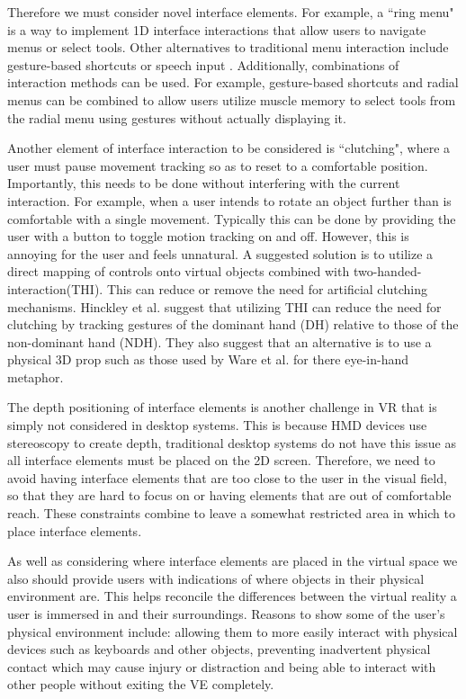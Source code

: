 \documentclass{sig-alternate-05-2015}
\begin{document}
Therefore we must consider novel interface elements. For example, a ``ring menu" is a way to implement 1D interface interactions that allow users to navigate menus or select tools\cite{Hand1997}. Other alternatives to traditional menu interaction include gesture-based shortcuts\cite{Zeleznik2007} or speech input \cite{VanDam1997,Bowman2001,Hand1997}. Additionally, combinations of interaction methods can be used. For example, gesture-based shortcuts and radial menus can be combined to allow users utilize muscle memory to select tools from the radial menu using gestures without actually displaying it.\cite{Kurtenbach1993}

Another element of interface interaction to be considered is ``clutching", where a user must pause movement tracking so as to reset to a comfortable position\cite{Hand1997}. Importantly, this needs to be done without interfering with the current interaction. For example, when a user intends to rotate an object further than is comfortable with a single movement. Typically this can be done by providing the user with a button to toggle motion tracking on and off. However, this is annoying for the user and feels unnatural\cite{Hand1997}.  A suggested solution is to utilize a direct mapping of controls onto virtual objects combined with two-handed-interaction(THI). This can reduce or remove the need for artificial clutching mechanisms\cite{Hand1997}.  Hinckley et al. suggest that utilizing THI can reduce the need for clutching by tracking gestures of the dominant hand (DH) relative to those of the non-dominant hand (NDH)\cite{Hinckley1994}. They also suggest that an alternative is to use a physical 3D prop such as those used by Ware et al. for there eye-in-hand metaphor\cite{Ware1990}.

The depth positioning of interface elements is another challenge in VR that is simply not considered in desktop systems.\cite{alger2015visual} This is because HMD devices use stereoscopy to create depth, traditional desktop systems do not have this issue as all interface elements must be placed on the 2D screen. Therefore, we need to avoid having interface elements that are too close to the user in the visual field, so that they are hard to focus on or having elements that are out of comfortable reach. These constraints combine to leave a somewhat restricted area in which to place interface elements.

As well as considering where interface elements are placed in the virtual space we also should provide users with indications of where objects in their physical environment are. This helps reconcile the differences between the virtual reality a user is immersed in and their surroundings\cite{Duval2014}. Reasons to show some of the user's physical environment include: allowing them to more easily interact with physical devices such as keyboards and other objects, preventing inadvertent physical contact which may cause injury or distraction and being able to interact with other people without exiting the VE completely.
\end{document}
